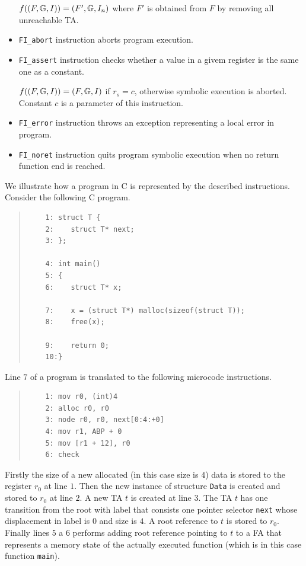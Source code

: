 \begin{itemize}
		$f((F, \mathbb{G}, I)) = (F', \mathbb{G}, I_n)$
		where $F'$ is obtained from $F$ by removing all unreachable
		TA.
	
	\item {\tt FI\_abort} instruction aborts program execution.
	
	\item {\tt FI\_assert} instruction checks whether a value
		in a givem register is the same one as a constant.
		
		$f((F, \mathbb{G}, I)) = (F, \mathbb{G}, I)$ if $r_s = c$, otherwise
		symbolic execution is aborted.
		Constant $c$ is a parameter of this instruction.
	
	\item {\tt FI\_error} instruction throws an exception representing
		a local error in program.
	
	\item {\tt FI\_noret} instruction quits program symbolic execution when
		no return function end is reached.

\end{itemize}

\bexmp
	We illustrate how a program in C is represented by the described instructions.
	Consider the following C program.

	\begin{quote}
	\begin{verbatim}
	1: struct T {
	2:    struct T* next;
	3: };

	4: int main()
	5: {
	6:    struct T* x;

	7:    x = (struct T*) malloc(sizeof(struct T));
	8:    free(x);

	9:    return 0;
	10:}
	\end{verbatim}
	\end{quote}

	Line $7$ of a program is translated to the following microcode instructions.
	\begin{quote}
	\begin{verbatim}
	1: mov r0, (int)4
	2: alloc r0, r0
	3: node r0, r0, next[0:4:+0]
	4: mov r1, ABP + 0
	5: mov [r1 + 12], r0    
	6: check
	\end{verbatim}
	\end{quote}

	Firstly the size of a new allocated (in this case size is $4$) data is stored to the register $r_0$ at line $1$.
	Then the new instance of structure {\tt Data} is created and stored to $r_0$ at line $2$.
	A new TA $t$ is created at line $3$.
	The TA $t$ has one transition from the root with label that consists one pointer selector {\tt next} whose
	displacement in label is $0$ and size is $4$.
	A root reference to $t$ is stored to $r_0$.
	Finally lines $5$ a $6$ performs adding root reference pointing to $t$ to a FA that represents
	a memory state of the actually executed function (which is in this case function {\tt main}).
\eexmp

